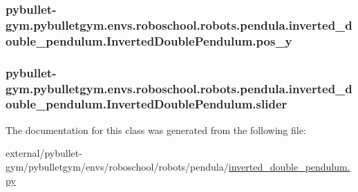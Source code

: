 \subsubsection[{\texorpdfstring{pos\+\_\+y}{pos_y}}]{\setlength{\rightskip}{0pt plus 5cm}pybullet-\/gym.\+pybulletgym.\+envs.\+roboschool.\+robots.\+pendula.\+inverted\+\_\+double\+\_\+pendulum.\+Inverted\+Double\+Pendulum.\+pos\+\_\+y}\hypertarget{classpybullet-gym_1_1pybulletgym_1_1envs_1_1roboschool_1_1robots_1_1pendula_1_1inverted__double_632710b238162c34f237573ee2b501d2_a76e46de1ca4e4f6154ce343688129708}{}\label{classpybullet-gym_1_1pybulletgym_1_1envs_1_1roboschool_1_1robots_1_1pendula_1_1inverted__double_632710b238162c34f237573ee2b501d2_a76e46de1ca4e4f6154ce343688129708}
\subsubsection[{\texorpdfstring{slider}{slider}}]{\setlength{\rightskip}{0pt plus 5cm}pybullet-\/gym.\+pybulletgym.\+envs.\+roboschool.\+robots.\+pendula.\+inverted\+\_\+double\+\_\+pendulum.\+Inverted\+Double\+Pendulum.\+slider}\hypertarget{classpybullet-gym_1_1pybulletgym_1_1envs_1_1roboschool_1_1robots_1_1pendula_1_1inverted__double_632710b238162c34f237573ee2b501d2_ae38b345468176daa3891923ba3a8e877}{}\label{classpybullet-gym_1_1pybulletgym_1_1envs_1_1roboschool_1_1robots_1_1pendula_1_1inverted__double_632710b238162c34f237573ee2b501d2_ae38b345468176daa3891923ba3a8e877}


The documentation for this class was generated from the following file\+:\begin{DoxyCompactItemize}
\item 
external/pybullet-\/gym/pybulletgym/envs/roboschool/robots/pendula/\hyperlink{roboschool_2robots_2pendula_2inverted__double__pendulum_8py}{inverted\+\_\+double\+\_\+pendulum.\+py}\end{DoxyCompactItemize}
